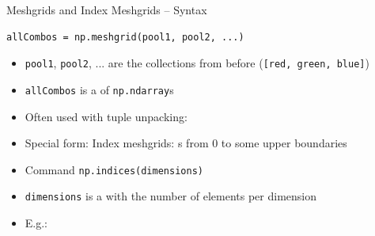 
\begin{frame}[fragile]{Meshgrids and Index Meshgrids -- Syntax}
%
\begin{codebox}
\begin{verbatim}
allCombos = np.meshgrid(pool1, pool2, ...)
\end{verbatim}
\end{codebox}
%
\begin{itemize}
\item \texttt{pool1}, \texttt{pool2}, ... are the collections from before (\eg \texttt{[red, green, blue]})
\item \texttt{allCombos} is a  of \texttt{np.ndarray}s
\item Often used with tuple unpacking:\\
\item Special form: Index meshgrids: s from 0 to some upper boundaries
\item Command \texttt{np.indices(dimensions)}
\item \texttt{dimensions} is a  with the number of elements per dimension
\item E.\;g.: 
\end{itemize}
%
\end{frame}


